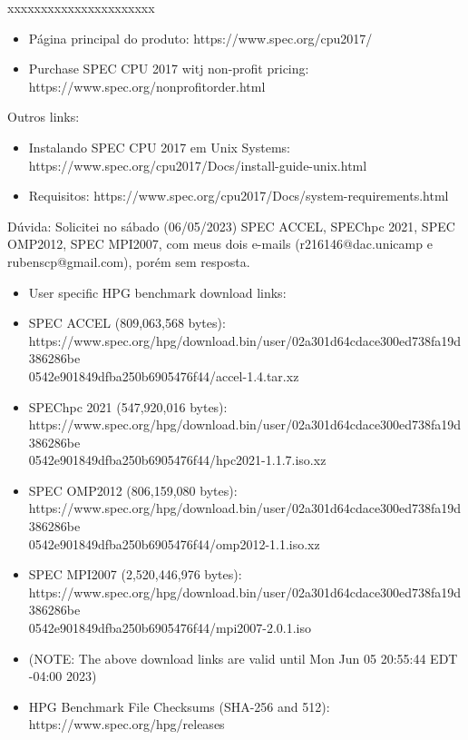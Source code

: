 xxxxxxxxxxxxxxxxxxxxxx \\

\begin{itemize}
    \item Página principal do produto: https://www.spec.org/cpu2017/
    \item Purchase SPEC CPU 2017 witj non-profit pricing: https://www.spec.org/nonprofitorder.html
\end{itemize}


Outros links:
\begin{itemize}
    \item Instalando SPEC CPU 2017 em Unix Systems: https://www.spec.org/cpu2017/Docs/install-guide-unix.html
    \item Requisitos: https://www.spec.org/cpu2017/Docs/system-requirements.html
\end{itemize}

Dúvida: Solicitei no sábado (06/05/2023)  SPEC ACCEL, SPEChpc 2021, SPEC OMP2012, SPEC MPI2007, com meus dois e-mails (r216146@dac.unicamp e rubenscp@gmail.com), porém sem resposta. 

\begin{itemize}
    \item User specific HPG benchmark download links:
    \item SPEC ACCEL (809,063,568 bytes): \\
    https://www.spec.org/hpg/download.bin/user/02a301d64cdace300ed738fa19d386286be \\
    0542e901849dfba250b6905476f44/accel-1.4.tar.xz
    \item SPEChpc 2021 (547,920,016 bytes): \\
    https://www.spec.org/hpg/download.bin/user/02a301d64cdace300ed738fa19d386286be \\
    0542e901849dfba250b6905476f44/hpc2021-1.1.7.iso.xz
    \item SPEC OMP2012 (806,159,080 bytes): \\
    https://www.spec.org/hpg/download.bin/user/02a301d64cdace300ed738fa19d386286be \\
    0542e901849dfba250b6905476f44/omp2012-1.1.iso.xz
    \item SPEC MPI2007 (2,520,446,976 bytes): \\
    https://www.spec.org/hpg/download.bin/user/02a301d64cdace300ed738fa19d386286be \\
    0542e901849dfba250b6905476f44/mpi2007-2.0.1.iso
    \item (NOTE: The above download links are valid until Mon Jun 05 20:55:44 EDT -04:00 2023)
    \item HPG Benchmark File Checksums (SHA-256 and 512): https://www.spec.org/hpg/releases
\end{itemize}




